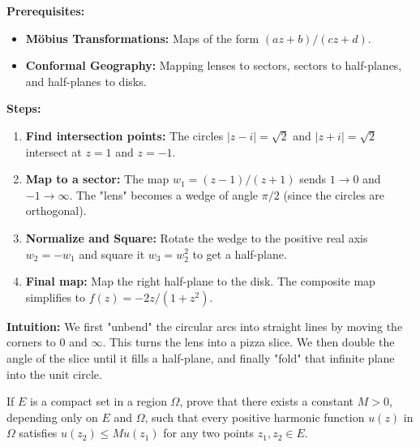 \begin{solution}
\textbf{Prerequisites:}
\begin{itemize}
    \item \textbf{Möbius Transformations:} Maps of the form $(az+b)/(cz+d)$.
    \item \textbf{Conformal Geography:} Mapping lenses to sectors, sectors to half-planes, and half-planes to disks.
\end{itemize}

\textbf{Steps:}
\begin{enumerate}
    \item \textbf{Find intersection points:} The circles $|z-i|=\sqrt{2}$ and $|z+i|=\sqrt{2}$ intersect at $z=1$ and $z=-1$.
    \item \textbf{Map to a sector:} The map $w_1 = (z-1)/(z+1)$ sends $1 \to 0$ and $-1 \to \infty$. The "lens" becomes a wedge of angle $\pi/2$ (since the circles are orthogonal).
    \item \textbf{Normalize and Square:} Rotate the wedge to the positive real axis $w_2 = -w_1$ and square it $w_3 = w_2^2$ to get a half-plane.
    \item \textbf{Final map:} Map the right half-plane to the disk. The composite map simplifies to $f(z) = -2z/(1+z^2)$.
\end{enumerate}

\textbf{Intuition:}
We first "unbend" the circular arcs into straight lines by moving the corners to 0 and $\infty$. This turns the lens into a pizza slice. We then double the angle of the slice until it fills a half-plane, and finally "fold" that infinite plane into the unit circle.
\end{solution}

\begin{exercise}
\label{analysis:2017:5}
If $E$ is a compact set in a region $\Omega$, prove that there exists a constant $M>0$, depending only on $E$ and $\Omega$, such that every positive harmonic function $u(z)$ in $\Omega$ satisfies $u(z_2)\leq Mu(z_1)$ for any two points $z_1,z_2\in E$.
\end{exercise}

